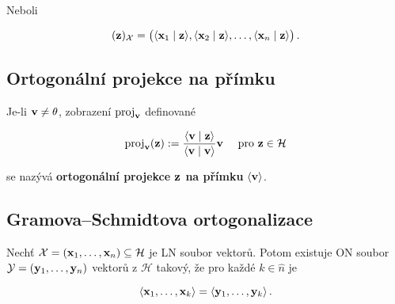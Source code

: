 \noindent Neboli

\[ (\mathbf{z})_{\mathcal X}=\big(\langle \mathbf{x}_1\mid \mathbf{z}\rangle, \langle \mathbf{x}_2\mid \mathbf{z}\rangle , \dots ,\langle \mathbf{x}_n\mid \mathbf{z}\rangle\big)\,. \]

\subsection*{Ortogonální projekce na přímku}

Je-li $\mathbf{v}\neq \theta$, zobrazení $\text{proj}_{\mathbf{v}}$ definované

\[ \text{proj}_{\mathbf{v}}(\mathbf{z}):=\frac{\langle \mathbf{v}\mid \mathbf{z}\rangle}{\langle \mathbf{v}\mid \mathbf{v}\rangle} \mathbf{v} \quad \text{ pro }\mathbf{z}\in \mathcal{H} \]

\noindent se nazývá \textbf{ortogonální projekce $\mathbf{z}$ na přímku} $\langle \mathbf{v}\rangle$.

\subsection*{Gramova--Schmidtova ortogonalizace}

Nechť $\mathcal{X}=(\mathbf{x}_1,\dots,\mathbf{x}_n)\subseteq \mathcal{H}$ je LN soubor
vektorů. Potom existuje ON soubor $\mathcal{Y}=(\mathbf{y}_1,\dots,\mathbf{y}_n)$ vektorů z
$\mathcal{H}$ takový, že pro každé $k\in \hat{n}$ je

\[ \langle\mathbf{x}_1,\dots,\mathbf{x}_k\rangle    =\langle\mathbf{y}_1,\dots,\mathbf{y}_k\rangle\,. \]

\pagebreak
